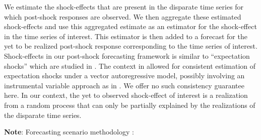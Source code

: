 \documentclass[11pt]{article}
\theoremstyle{definition}
\begin{document}
We estimate the shock-effects that are present in the disparate time series for which post-shock responses are observed. We then aggregate these estimated shock-effects and use this aggregated estimate as an estimator for the shock-effect in the time series of interest. This estimator is then added to a forecast for the yet to be realized post-shock response corresponding to the time series of interest. Shock-effects in our post-shock forecasting framework is similar to ``expectation shocks'' which are studied in \cite{clements2019measuring}. The context in \cite{clements2019measuring} allowed for consistent estimation of expectation shocks under a vector autoregressive model, possibly involving an instrumental variable approach as in \cite{croushore2006data}. We offer no such consistency guarantee here. In our context, the yet to observed shock-effect of interest is a realization from a random process that can only be partially explained by the realizations of the disparate time series. 


{\bf Note}: Forecasting scenario methodology \citep{baumeister2014real, kilian2017structural}: 



\end{document}

